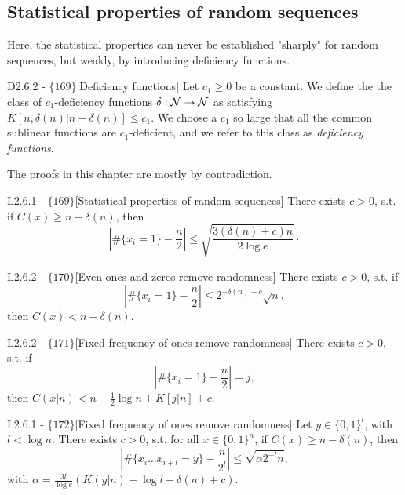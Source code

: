 \documentclass{article}
\begin{document}
\subsection{Statistical properties of random sequences}

Here, the statistical properties can never be established "sharply" for random sequences, but weakly, by introducing deficiency functions.

\begin{flexidefinition}{D2.6.2 - $\{169\}$}[Deficiency functions]
    Let $c_1 \geq 0$ be a constant. We define the the class of $c_1$-deficiency functions $\delta : \mathcal{N} \to \mathcal{N}$ as satisfying $K[n, \delta(n)|n - \delta(n)] \leq c_1$. We choose a $c_1$ so large that all the common sublinear functions are $c_1$-deficient, and we refer to this class as \textit{deficiency functions}.
\end{flexidefinition}

The proofs in this chapter are mostly by contradiction.
\begin{flexilemma}{L2.6.1 - $\{169\}$}[Statistical properties of random sequences] There exists $c>0$, s.t. if $C(x) \geq n - \delta(n)$, then
    \begin{equation}
        \left| \# \{ x_i = 1\} - \frac{n}{2} \right| \leq \sqrt{\frac{3(\delta(n) + c)n}{2\log e}}\cdot
    \end{equation}
    
\end{flexilemma}

\begin{flexilemma}{L2.6.2 - $\{170\}$}[Even ones and zeros remove randomness] There exists $c>0$, s.t. if
    \begin{equation}
        \left| \# \{ x_i = 1\} - \frac{n}{2} \right| \leq 2^{-\delta(n)-c}\sqrt{n},
    \end{equation}
then $C(x) < n - \delta(n)$.
\end{flexilemma}

\begin{flexilemma}{L2.6.2 - $\{171\}$}[Fixed frequency of ones remove randomness] There exists $c>0$, s.t. if
    \begin{equation}
        \left| \# \{ x_i = 1\} - \frac{n}{2} \right| = j,
    \end{equation}
then $C(x|n) < n - \frac{1}{2}\log n + K[j|n] + c$.
\end{flexilemma}


\begin{flexitheorem}{L2.6.1 - $\{172\}$}[Fixed frequency of ones remove randomness] Let $y \in \{0,1\}^l$, with $l < \log n$. There exists $c>0$, s.t. for all $x \in \{0,1\}^n$, if $C(x) \geq n - \delta(n)$, then
    \begin{equation}
        \left| \# \{ x_i\ldots x_{i+l} = y\} - \frac{n}{2^l} \right| \leq \sqrt{\alpha 2^{-l} n},
    \end{equation}
with $\alpha = \frac{3l}{\log e} \left(K(y|n) + \log l + \delta(n) + c \right)$.
\end{flexitheorem}
\end{document}
